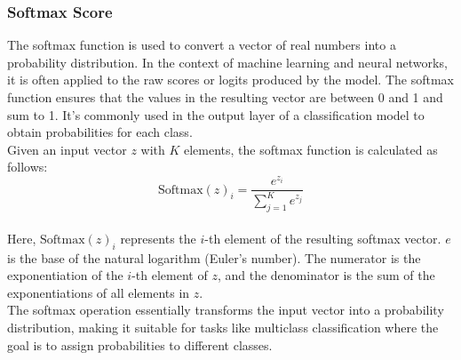 \subsubsection{Softmax Score}
The softmax function is used to convert a vector of real numbers into a probability distribution. In the context of machine learning and neural networks, it is often applied to the raw scores or logits produced by the model. The softmax function ensures that the values in the resulting vector are between 0 and 1 and sum to 1. It's commonly used in the output layer of a classification model to obtain probabilities for each class.\\

Given an input vector \(z\) with \(K\) elements, the softmax function is calculated as follows:\\

\[ \text{Softmax}(z)_i = \frac{e^{z_i}}{\sum_{j=1}^{K} e^{z_j}} \]\\

Here, \(\text{Softmax}(z)_i\) represents the \(i\)-th element of the resulting softmax vector. \(e\) is the base of the natural logarithm (Euler's number). The numerator is the exponentiation of the \(i\)-th element of \(z\), and the denominator is the sum of the exponentiations of all elements in \(z\).\\

The softmax operation essentially transforms the input vector into a probability distribution, making it suitable for tasks like multiclass classification where the goal is to assign probabilities to different classes.\\





